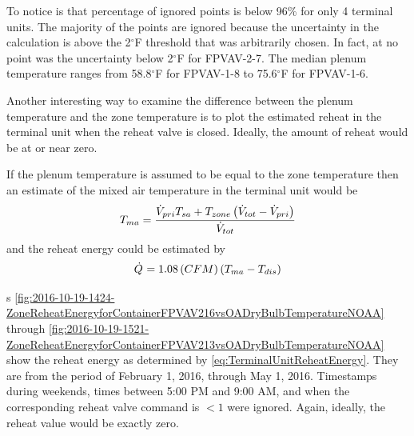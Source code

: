 To notice is that percentage of ignored points is below 96\% for only 4
terminal units.  The majority of the points are ignored because the
uncertainty in the calculation is above the 2\(^\circ\)F threshold that
was arbitrarily chosen.  In fact, at no point was the uncertainty below
2\(^\circ\)F for FPVAV-2-7.  The median plenum temperature ranges from
58.8\(^\circ\)F for FPVAV-1-8 to 75.6\(^\circ\)F for FPVAV-1-6.

Another interesting way to examine the difference between the plenum
temperature and the zone temperature is to plot the estimated reheat in
the terminal unit when the reheat valve is closed.  Ideally, the amount
of reheat would be at or near zero. 

If the plenum temperature is assumed to be equal to the zone temperature
then an estimate of the mixed air temperature in the terminal unit would
be
\begin{equation}
    T_{ma} = \frac{\dot{V}_{pri} T_{sa} + T_{zone} \left( \dot{V}_{tot} - \dot{V}_{pri} \right) }{ \dot{V}_{tot}}
    \label{eq:TerminalUnitMixedAirTemp}
\end{equation}
and the reheat energy could be estimated by
\begin{equation}
    \dot{Q}_{} = 1.08 \left( CFM \right) \left( T_{ma} - T_{dis}  \right)
    \label{eq:TerminalUnitReheatEnergy}
\end{equation}

\figref{}s
\ref{fig:2016-10-19-1424-ZoneReheatEnergyforContainerFPVAV216vsOADryBulbTemperatureNOAA}
through
\ref{fig:2016-10-19-1521-ZoneReheatEnergyforContainerFPVAV213vsOADryBulbTemperatureNOAA}
show the reheat energy as determined by 
\ref{eq:TerminalUnitReheatEnergy}. They are from the period of February
1, 2016, through May 1, 2016.  Timestamps during weekends, times between
5:00 PM and 9:00 AM, and when the corresponding reheat valve command is
\( < 1 \) were ignored. Again, ideally, the reheat value would be
exactly zero.


